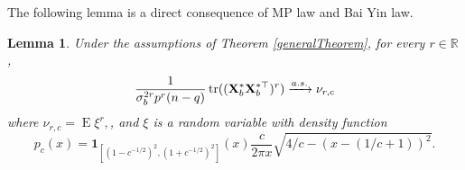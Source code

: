 \documentclass[11pt]{article}
\DeclareMathOperator{\mytr}{tr}
\DeclareMathOperator{\myE}{E}
\theoremstyle{plain}
\newtheorem{lemma}{\quad\quad Lemma}
\theoremstyle{definition}
\theoremstyle{remark}
\begin{document}
The following lemma is a direct consequence of MP law and Bai Yin law.
\begin{lemma}\label{lemma:MP}
    Under the assumptions of Theorem \ref{generalTheorem}, for every $r\in \mathbb R$,
    \begin{equation*}
        \frac{1}{\sigma_b^{2r} p^r (n-q)}\mytr ((\BX_b^* \BX_b^{*\top})^{r} )
        \xrightarrow{a.s.}
        \nu_{r,c}
    \end{equation*}
    where $
        \nu_{r,c}
        =
        \myE \xi^r,
        $, and $\xi$ is a random variable with density function
    \begin{equation*}
        p_{c}(x)=\mathbf{1}_{\left[(1-c^{-1/2})^2,(1+c^{-1/2})^2\right]}(x)
        \frac{c}{2\pi x} \sqrt{4/c - \left(x-(1/c+1)\right)^2}.
    \end{equation*}
\end{lemma}

















\end{document}
